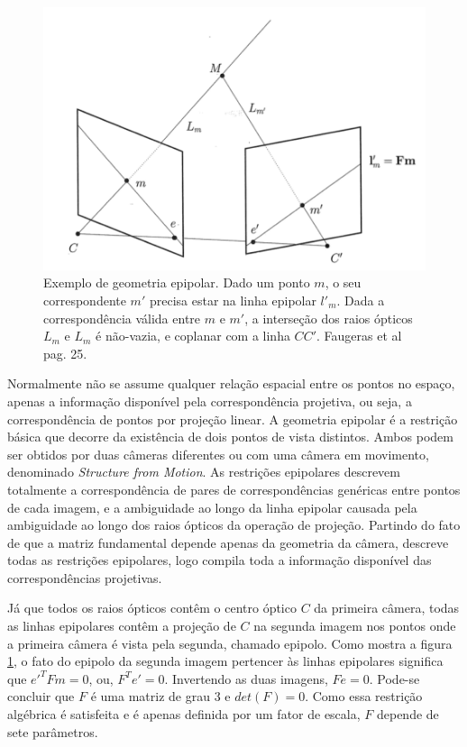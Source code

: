 \begin{figure}[H]
	\centering
		\includegraphics{Imagens/figura2-4.png}
	\caption{Exemplo de geometria epipolar. Dado um ponto $m$, o seu correspondente $m'$ precisa estar na linha epipolar $l'_{m}$. Dada a correspondência válida entre $m$ e $m'$, a interseção dos raios ópticos $L_m$ e $L_m$ é não-vazia, e coplanar com a linha $CC'$. Faugeras et al \cite{Faugeras-Geometry} pag. 25.}
	\label{fig4}
\end{figure}

Normalmente não se assume qualquer relação espacial entre os pontos no espaço, apenas a informação disponível pela correspondência projetiva, ou seja, a correspondência de pontos por projeção linear. A geometria epipolar é a restrição básica que decorre da existência de dois pontos de vista distintos. Ambos podem ser obtidos por duas câmeras diferentes ou com uma câmera em movimento, denominado \textit{Structure from Motion}. As restrições epipolares descrevem totalmente a correspondência de pares de correspondências genéricas entre pontos de cada imagem, e a ambiguidade ao longo da linha epipolar causada pela ambiguidade ao longo dos raios ópticos da operação de projeção. Partindo do fato de que a matriz fundamental depende apenas da geometria da câmera, descreve todas as restrições epipolares, logo compila toda a informação disponível das correspondências projetivas. 

Já que todos os raios ópticos contêm o centro óptico $C$ da primeira câmera, todas as linhas epipolares contêm a projeção de $C$ na segunda imagem nos pontos onde a primeira câmera é vista pela segunda, chamado epipolo. Como mostra a figura \ref{fig4}, o fato do epipolo da segunda imagem pertencer às linhas epipolares significa que $e'^{T}Fm = 0$, ou, $F^{T}e' = 0$. Invertendo as duas imagens, $Fe = 0$. Pode-se concluir que $F$ é uma matriz de grau 3 e $det(F) = 0$. Como essa restrição algébrica é satisfeita e é apenas definida por um fator de escala, $F$ depende de sete parâmetros.

